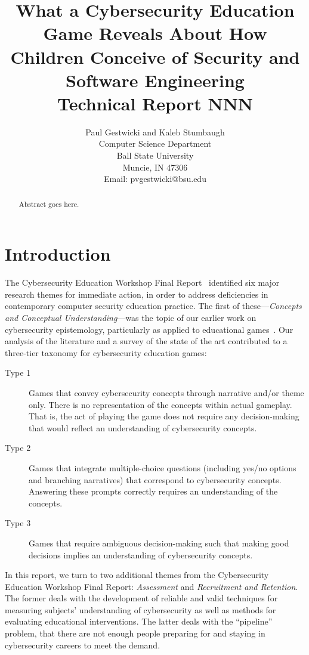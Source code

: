 \documentclass[letterpaper]{article}
\title{What a Cybersecurity Education Game Reveals About How Children Conceive of Security and Software Engineering\\
\medskip
\serc{} Technical Report \textbf{NNN}\\
}
\author{Paul Gestwicki and Kaleb Stumbaugh\\
Computer Science Department\\
Ball State University\\
Muncie, IN 47306\\
Email: pvgestwicki@bsu.edu}
\begin{document}
\maketitle


\begin{abstract}
  Abstract goes here.
\end{abstract}

\section{Introduction}

The Cybersecurity Education Workshop Final
Report~\cite{Cybersecurity2014} identified six major research themes
for immediate action, in order to address deficiencies in contemporary
computer security education practice. The first of these---\textit{Concepts and Conceptual Understanding}---was the topic of our earlier work
on cybersecurity epistemology, particularly as applied to
educational games~\citep{Gestwicki2015,Gestwicki2015-tr}.
Our analysis of the literature and a survey of the state of the art
contributed to a three-tier taxonomy for cybersecurity education games:

\begin{description}
\item[Type 1] Games that convey cybersecurity concepts through
 narrative and/or theme only. There is no representation of
 the concepts within actual gameplay. That is, the act of playing
 the game does not require any decision-making that would reflect
 an understanding of cybersecurity concepts.
\item[Type 2] Games that integrate multiple-choice questions
  (including yes/no options and branching narratives)
  that correspond to cybersecurity concepts.
  Answering these prompts correctly requires an understanding
  of the concepts.
\item[Type 3] Games that require ambiguous decision-making
 such that making good decisions implies an understanding of
 cybersecurity concepts.
 \end{description}

In this report, we turn to two additional themes from the
Cybersecurity Education Workshop Final Report:
\textit{Assessment} and \textit{Recruitment and Retention}.
The former deals with the development of reliable and valid
techniques for measuring subjects' understanding of cybersecurity
as well as methods for evaluating educational interventions.
The latter deals with the ``pipeline'' problem, that there are not enough
people preparing for and staying in cybersecurity careers to meet the demand.
\end{document}
